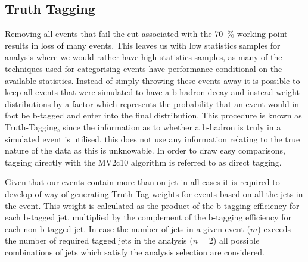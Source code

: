\subsection{Truth Tagging}
\label{subsec:truth-tagging}

Removing all events that fail the cut associated with the 70~\% working point
results in loss of many events. This leaves us with low statistics samples for
analysis where we would rather have high statistics samples, as many of the
techniques used for categorising events have performance conditional on the
available statistics. Instead of simply throwing these events away it is
possible to keep all events that were simulated to have a b-hadron decay and
instead weight distributions by a factor which represents the probability that
an event would in fact be b-tagged and enter into the final distribution. This
procedure is known as Truth-Tagging, since the information as to whether a
b-hadron is truly in a simulated event is utilised, this does not use any
information relating to the true nature of the data as this is unknowable. In
order to draw easy comparisons, tagging directly with the MV2c10 algorithm is
referred to as direct tagging.

Given that our events contain more than on jet in all cases it is required to
develop of way of generating Truth-Tag weights for events based on all the jets
in the event. This weight is calculated as the product of the b-tagging
efficiency for each b-tagged jet, multiplied by the complement of the b-tagging
efficiency for each non b-tagged jet. In case the number of jets in a given
event ($m$) exceeds the number of required tagged jets in the analysis ($n=2$)
all possible combinations of jets which satisfy the analysis selection are
considered.

